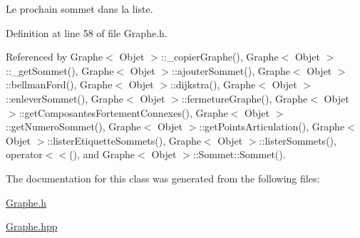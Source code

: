 Le prochain sommet dans la liste. 



Definition at line 58 of file Graphe.h.



Referenced by Graphe$<$ Objet $>$::\_\-copierGraphe(), Graphe$<$ Objet $>$::\_\-getSommet(), Graphe$<$ Objet $>$::ajouterSommet(), Graphe$<$ Objet $>$::bellmanFord(), Graphe$<$ Objet $>$::dijkstra(), Graphe$<$ Objet $>$::enleverSommet(), Graphe$<$ Objet $>$::fermetureGraphe(), Graphe$<$ Objet $>$::getComposantesFortementConnexes(), Graphe$<$ Objet $>$::getNumeroSommet(), Graphe$<$ Objet $>$::getPointsArticulation(), Graphe$<$ Objet $>$::listerEtiquetteSommets(), Graphe$<$ Objet $>$::listerSommets(), operator$<$$<$(), and Graphe$<$ Objet $>$::Sommet::Sommet().



The documentation for this class was generated from the following files:\begin{DoxyCompactItemize}
\item 
\hyperlink{_graphe_8h}{Graphe.h}\item 
\hyperlink{_graphe_8hpp}{Graphe.hpp}\end{DoxyCompactItemize}

